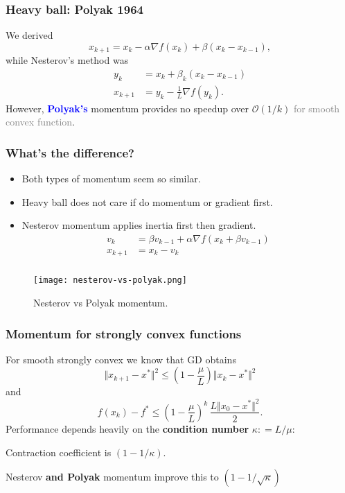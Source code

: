 \documentclass[aspectration=169]{beamer}
\begin{document}
\begin{frame}
  \frametitle{Heavy ball:  Polyak 1964}
  We derived
  \begin{equation}
    x_{k+1} = x_k - \alpha \nabla f(x_k) + \beta (x_k - x_{k-1}),
  \end{equation}
  while Nesterov's method was
  \begin{align}
    y_{k} &= x_k + \beta_k (x_k - x_{k-1}) \\
    x_{k+1} &= y_k - \frac{1}{L} \nabla f(y_k).
  \end{align}
  However, \textcolor{blue}{\textbf{Polyak's}} momentum provides no speedup over $\mathcal{O}(1/k)$ \textcolor{gray}{for smooth convex function}.
\end{frame}


\begin{frame}
  \frametitle{What's the difference?}
  \begin{itemize}
    \item Both types of momentum seem so similar.
    \item Heavy ball does not care if do momentum or gradient first.
    \item Nesterov momentum applies inertia first then gradient.
          \begin{align}
            v_k &= \beta v_{k-1} + \alpha \nabla f(x_k + \beta v_{k-1}) \\
            x_{k+1} &= x_k - v_k
          \end{align}
  \end{itemize}
\end{frame}

\begin{frame}
  \frametitle{}

  \begin{figure}[ht]
    \centering
    \texttt{[image: nesterov-vs-polyak.png]}
    \caption{Nesterov vs Polyak momentum.}
  \end{figure}
\end{frame}

\begin{frame}
  \frametitle{Momentum for strongly convex functions}

  For smooth strongly convex we know that GD obtains
  \begin{equation}
    \Vert x_{k+1} - x^* \Vert^2 \le (1 - \frac{\mu}{L}) \Vert x_k -x^* \Vert^2
  \end{equation}
  and
  \begin{equation}
    f(x_k)-f^* \le {\left(1-\frac{\mu}{L}\right)}^k \, \frac{L \Vert x_0 -x^* \Vert^2}{2}.
  \end{equation}
  Performance depends heavily on the \textbf{condition number} $\kappa : = L/\mu$:
  \begin{block}{}
    Contraction coefficient is $(1-1/\kappa)$.
  \end{block}

  Nesterov \textbf{and Polyak} momentum improve this to $(1-1/\sqrt{\kappa})$
\end{frame}
\end{document}
